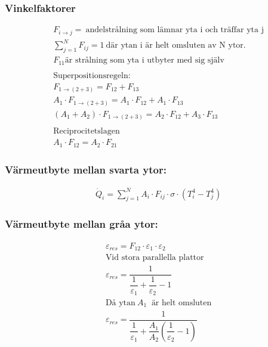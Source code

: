 \subsubsection*{Vinkelfaktorer}
\begin{align*}
	& F_{i \rightarrow j} = \ \text{andelstrålning som lämnar yta i och träffar yta j} \\
	& \sum\limits_{j=1}^N F_{ij} = 1 \ \text{där ytan i är helt omsluten av N ytor.} \\ 
	& F_{11} \text{är strålning som yta i utbyter med sig själv}\\
	\\
	& \text{Superpositionsregeln:} \\
	& F_{1 \rightarrow (2+3)} = F_{12} + F_{13} \\
	& A_1  \cdot F_{1 \rightarrow (2+3)} = A_1 \cdot F_{12} + A_1 \cdot F_{13} \\
	& (A_1 + A_2) \cdot F_{1 \rightarrow (2+3)} = A_2 \cdot F_{12} + A_3 \cdot F_{13} \\
	\\
	& \text{Reciprocitetslagen} \\
	& A_1 \cdot F_{12} = A_2 \cdot F_{21}
\end{align*}
\subsubsection*{Värmeutbyte mellan svarta ytor:}
\begin{align*}
	& \dot{Q}_i = \sum\limits_{j=1}^N A_i \cdot F_{ij} \cdot \sigma \cdot \left( T_i^4 - T_j^4 \right) 
\end{align*}
\subsubsection*{Värmeutbyte mellan gråa ytor:}
\begin{align*}
&	\varepsilon_{res} = F_{12} \cdot \varepsilon_{1} \cdot \varepsilon_{2} \\
& \text{Vid stora parallella plattor} \\
& \varepsilon_{res} = \dfrac{1}{\dfrac{1}{\varepsilon_{1}} + \dfrac{1}{\varepsilon_{2}} -1 } \\
& \text{Då ytan} \ A_1 \ \text{ är helt omsluten} \\
& \varepsilon_{res} = \dfrac{1}{\dfrac{1}{\varepsilon_{1}} + \dfrac{A_1}{A_2}\left(\dfrac{1}{\varepsilon_{2}} -1 \right)}
\end{align*}
